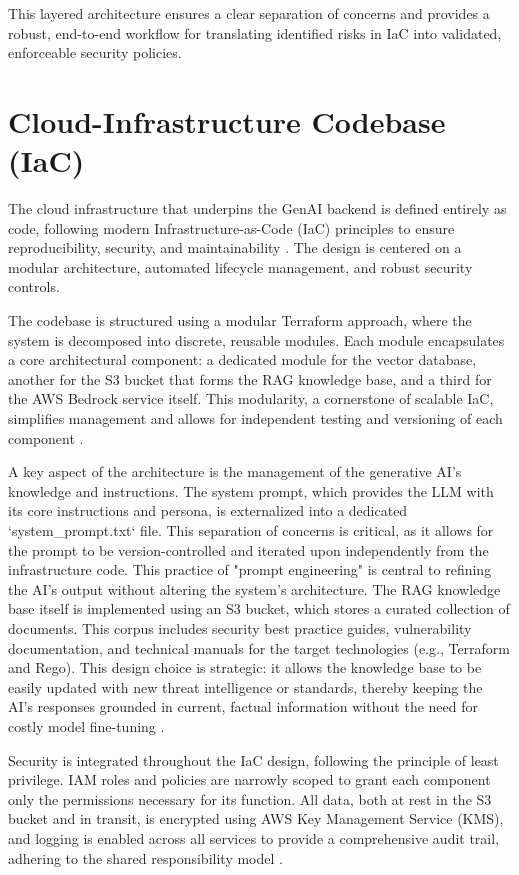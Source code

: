 This layered architecture ensures a clear separation of concerns and provides a robust, end-to-end workflow for translating identified risks in IaC into validated, enforceable security policies.

\section{Cloud-Infrastructure Codebase (IaC)}

The cloud infrastructure that underpins the GenAI backend is defined entirely as code, following modern Infrastructure-as-Code (IaC) principles to ensure reproducibility, security, and maintainability \cite{morris_infrastructure_2016}. The design is centered on a modular architecture, automated lifecycle management, and robust security controls.

The codebase is structured using a modular Terraform approach, where the system is decomposed into discrete, reusable modules. Each module encapsulates a core architectural component: a dedicated module for the vector database, another for the S3 bucket that forms the RAG knowledge base, and a third for the AWS Bedrock service itself. This modularity, a cornerstone of scalable IaC, simplifies management and allows for independent testing and versioning of each component \cite{hashicorp_terraform_2022}.

A key aspect of the architecture is the management of the generative AI's knowledge and instructions. The system prompt, which provides the LLM with its core instructions and persona, is externalized into a dedicated `system_prompt.txt` file. This separation of concerns is critical, as it allows for the prompt to be version-controlled and iterated upon independently from the infrastructure code. This practice of "prompt engineering" is central to refining the AI's output without altering the system's architecture. The RAG knowledge base itself is implemented using an S3 bucket, which stores a curated collection of documents. This corpus includes security best practice guides, vulnerability documentation, and technical manuals for the target technologies (e.g., Terraform and Rego). This design choice is strategic: it allows the knowledge base to be easily updated with new threat intelligence or standards, thereby keeping the AI's responses grounded in current, factual information without the need for costly model fine-tuning \cite{ozgur_simple_2024}.

Security is integrated throughout the IaC design, following the principle of least privilege. IAM roles and policies are narrowly scoped to grant each component only the permissions necessary for its function. All data, both at rest in the S3 bucket and in transit, is encrypted using AWS Key Management Service (KMS), and logging is enabled across all services to provide a comprehensive audit trail, adhering to the shared responsibility model \cite{sarathe_krisshnan_jutoo_vijayaraghavan_policy_2025}.

